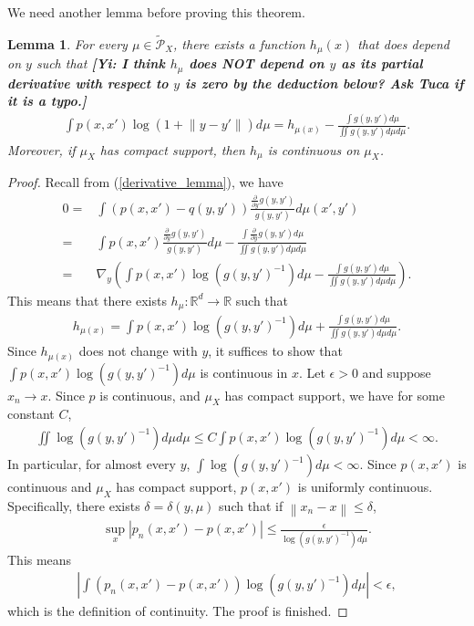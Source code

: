 \documentclass[10pt]{article}
\newcommand{\norm}[1]{\left\lVert#1\right\rVert}
\newcommand{\gy}[1]{\textbf{\color{gred}[Yi: #1]}}
\newtheorem{lemma}{\bf Lemma}
\newenvironment{Proof of lemma}{\noindent{\bf Proof of Lemma}}{\hfill$\Box$\newline}
\newenvironment{Proof of claim}{\noindent{\bf Proof of claim}}{\hfill$\Box$\newline}
\newenvironment{Proof of theorem}{\noindent{\bf Proof of Theorem}}{\hfill\scriptsize{$\Box$}\newline}
\newenvironment{Proof of theorems}{\noindent{\bf Proof of Theorems}}{\hfill$\Box$\newline}
\newenvironment{Proof of proposition}{\noindent{\bf Proof of Proposition}}{\hfill$\Box$\newline}
\newenvironment{Proof of propositions}{\noindent{\bf Proof of Propositions}}{\hfill$\Box$\newline}
\newenvironment{Proof of exercise}{\noindent{\it Proof of Exercise:}}{\hfill$\Box$}
\numberwithin{equation}{section}
\begin{document}
We need another lemma before proving this theorem.
\begin{lemma} \label{home_stretch_lemma}
    For every $\mu \in \tilde{\mathcal{P}}_X$, there exists a function $h_{\mu}(x)$ that does depend on $y$ such that \gy{I think $h_{\mu}$ does NOT depend on $y$ as its partial derivative with respect to $y$ is zero by the deduction below? Ask Tuca if it is a typo.}
    \begin{align}
        \int p(x,x') \log(1+\norm{y-y'})d\mu = h_{\mu(x)} - \frac{\int g(y,y')d\mu}{\iint g(y,y')d\mu d\mu}.
    \end{align}
    Moreover, if $\mu_X$ has compact support, then $h_{\mu}$ is continuous on $\mu_X$.
\end{lemma}
\begin{proof}
    Recall from (\ref{derivative_lemma}), we have
    \begin{align}
        0 = & \int (p(x,x')-q(y,y')) \frac{\frac{\partial}{\partial y}g(y,y')}{g(y,y')} d\mu(x',y') \nonumber                                                               \\
        =   & \int p(x,x') \frac{\frac{\partial}{\partial y}g(y,y')}{g(y,y')} d \mu -  \frac{\int \frac{\partial}{\partial y}g(y,y')d\mu}{\iint g(y,y')d\mu d\mu} \nonumber \\
        =   & \nabla_y \left(\int p(x,x') \log (g(y,y')^{-1}) d \mu -  \frac{\int g(y,y')d\mu}{\iint g(y,y')d\mu d\mu}\right).
    \end{align}
    This means that there exists $h_{\mu}: \mathbb{R}^d \to \mathbb{R}$ such that
    \begin{align}
        h_{\mu(x)} = \int p(x,x') \log(g(y,y')^{-1})d\mu + \frac{\int g(y,y')d\mu}{\iint g(y,y')d\mu d\mu}.
    \end{align}
    Since $h_{\mu(x)}$ does not change with $y$, it suffices to show that $\int p(x,x') \log(g(y,y')^{-1})d\mu$ is continuous in $x$. Let $\epsilon>0$ and suppose $x_n \to x$. Since $p$ is continuous, and $\mu_X$ has compact support, we have for some constant $C$,
    \begin{align}
        \iint \log(g(y,y')^{-1})d\mu d\mu \leq C \int p(x,x') \log(g(y,y')^{-1})d\mu < \infty.
    \end{align}
    In particular, for almost every $y$, $\int \log(g(y,y')^{-1})d\mu < \infty$. Since $p(x,x')$ is continuous and $\mu_X$ has compact support, $p(x,x')$ is uniformly continuous. Specifically, there exists $\delta = \delta(y,\mu)$ such that if $\norm{x_n-x} \leq \delta$,
    \begin{align}
        \sup_x |p_n(x,x')-p(x,x')| \leq \frac{\epsilon}{\log(g(y,y')^{-1})d\mu}.
    \end{align}
    This means
    \begin{align}
        \left|\int(p_n(x,x')-p(x,x')) \log(g(y,y')^{-1})d \mu\right| < \epsilon,
    \end{align}
    which is the definition of continuity. The proof is finished.
\end{proof}
\end{document}
